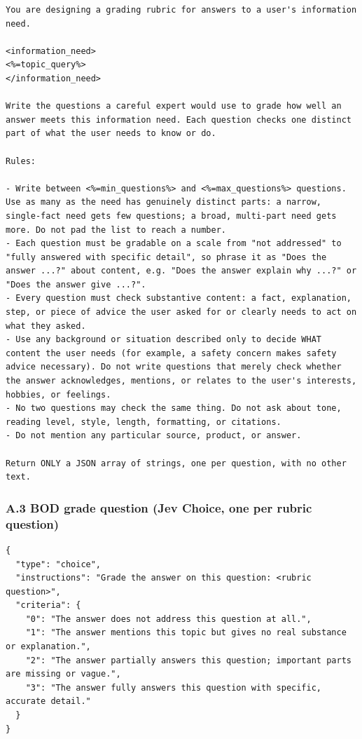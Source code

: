 \documentclass[
  10pt,
]{article}
\begin{document}
\begin{lstlisting}
You are designing a grading rubric for answers to a user's information need.

<information_need>
<%=topic_query%>
</information_need>

Write the questions a careful expert would use to grade how well an answer meets this information need. Each question checks one distinct part of what the user needs to know or do.

Rules:

- Write between <%=min_questions%> and <%=max_questions%> questions. Use as many as the need has genuinely distinct parts: a narrow, single-fact need gets few questions; a broad, multi-part need gets more. Do not pad the list to reach a number.
- Each question must be gradable on a scale from "not addressed" to "fully answered with specific detail", so phrase it as "Does the answer ...?" about content, e.g. "Does the answer explain why ...?" or "Does the answer give ...?".
- Every question must check substantive content: a fact, explanation, step, or piece of advice the user asked for or clearly needs to act on what they asked.
- Use any background or situation described only to decide WHAT content the user needs (for example, a safety concern makes safety advice necessary). Do not write questions that merely check whether the answer acknowledges, mentions, or relates to the user's interests, hobbies, or feelings.
- No two questions may check the same thing. Do not ask about tone, reading level, style, length, formatting, or citations.
- Do not mention any particular source, product, or answer.

Return ONLY a JSON array of strings, one per question, with no other text.
\end{lstlisting}

\subsubsection{A.3 BOD grade question (Jev Choice, one per rubric
question)}\label{a.3-bod-grade-question-jev-choice-one-per-rubric-question}

\begin{lstlisting}
{
  "type": "choice",
  "instructions": "Grade the answer on this question: <rubric question>",
  "criteria": {
    "0": "The answer does not address this question at all.",
    "1": "The answer mentions this topic but gives no real substance or explanation.",
    "2": "The answer partially answers this question; important parts are missing or vague.",
    "3": "The answer fully answers this question with specific, accurate detail."
  }
}
\end{lstlisting}
\end{document}
